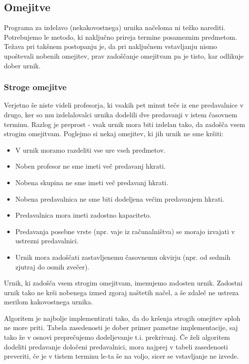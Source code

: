 \documentclass[a4paper,10pt]{article}
\begin{document}
\subsection{Omejitve}
Programa za izdelavo (nekakovostnega) urnika načeloma ni težko narediti. Potrebujemo
le metodo, ki naključno prireja termine posameznim predmetom. Težava pri takšnem postopanju
je, da pri naključnem vstavljanju nismo upoštevali nobenih omejitev, prav zadoščanje omejitvam
pa je tisto, kar odlikuje dober urnik.
\subsubsection{Stroge omejitve}
Verjetno še niste videli profesorja, ki vsakih pet minut teče iz ene predavalnice v drugo,
ker so mu izdelalovalci urnika dodelili dve predavanji v istem časovnem terminu. Razlog
je preprost - vsak urnik mora biti izdelan tako, da zadošča vsem strogim omejitvam.
Poglejmo si nekaj omejitev, ki jih urnik ne sme kršiti:
\begin{itemize}
   \item V urnik moramo razdeliti vse ure vseh predmetov.
   \item Noben profesor ne sme imeti več predavanj hkrati.
   \item Nobena skupina ne sme imeti več predavanj hkrati.
   \item Nobena predavalnica ne sme biti dodeljena večim predavanjem hkrati.
   \item Predavalnica mora imeti zadostno kapaciteto.
   \item Predavanja posebne vrste (npr. vaje iz računalništva) se morajo izvajati v ustrezni predavalnici.
   \item Urnik mora zadoščati zastavljenemu časovnemu okvirju (npr. od sedmih zjutraj do osmih zvečer).
\end{itemize}
Urnik, ki zadošča vsem strogim omejitvam, imenujemo zadosten urnik. Zadostni urnik tako ne
krši nobenega izmed zgoraj naštetih načel, a še zdaleč ne ustreza merilom kakovostnega urnika.

Algoritem je najbolje implementirati tako, da do kršenja strogih omejitev sploh ne more priti.
Tabela zasedenosti je dober primer pametne implementacije, saj tako že v osnovi  preprečujemo
dodeljevanje t.i. prekrivanj. Če želi algoritem dodeliti predavanje določeni predavalnici,
mora najprej v tabeli zasedenosti preveriti, če je v tistem terminu le-ta še na voljo,
sicer se vstavljanje ne izvede.
\end{document}
